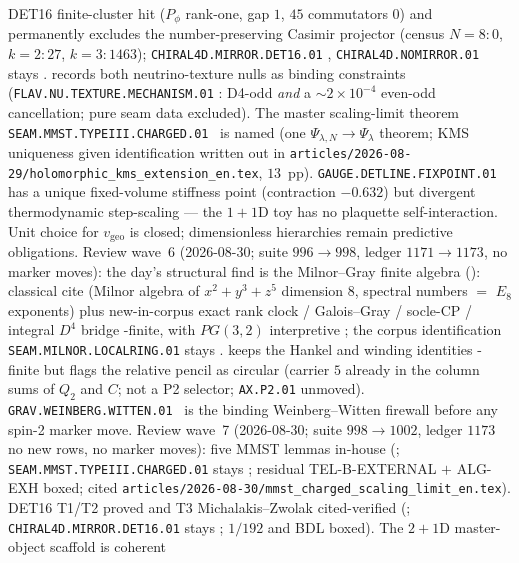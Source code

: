 \begin{keybox}
DET16 finite-cluster hit ($P_\phi$ rank-one, gap $1$, $45$ commutators $0$) and permanently
excludes the number-preserving Casimir projector (census $N{=}8{:}0$, $k{=}2{:}27$,
$k{=}3{:}1463$); \texttt{CHIRAL4D.MIRROR.DET16.01} \mC, \texttt{CHIRAL4D.NOMIRROR.01} stays \mO.
 records both
neutrino-texture nulls as binding constraints (\texttt{FLAV.NU.TEXTURE.MECHANISM.01} \mO:
D4-odd \emph{and} a $\sim2{\times}10^{-4}$ even-odd cancellation; pure seam data excluded).
The master scaling-limit theorem \texttt{SEAM.MMST.TYPEIII.CHARGED.01} \mO\ is named (one
$\Psi_{\lambda,N}\to\Psi_\lambda$ theorem; KMS uniqueness given identification written out in
\texttt{articles/2026-08-29/holomorphic\_kms\_extension\_en.tex}, $13$~pp).
\texttt{GAUGE.DETLINE.FIXPOINT.01} has a unique fixed-volume stiffness point (contraction
$-0.632$) but divergent thermodynamic step-scaling --- the $1{+}1$D toy has no plaquette
self-interaction.  Unit choice for $v_{\mathrm{geo}}$ is closed; dimensionless hierarchies
remain predictive obligations.
Review wave~6 (2026-08-30; suite $996\to998$, ledger $1171\to1173$, no marker moves):
the day's structural find is the Milnor--Gray finite algebra
():
classical cite (Milnor algebra of $x^2+y^3+z^5$ dimension $8$, spectral numbers $=$ $E_8$
exponents) plus new-in-corpus exact rank clock / Galois--Gray / socle-CP / integral $D^4$
bridge \mE-finite, with $PG(3,2)$ interpretive \mC; the corpus identification
\texttt{SEAM.MILNOR.LOCALRING.01} stays \mO.
 keeps the
Hankel and winding identities \mE-finite but flags the relative pencil as circular
(carrier $5$ already in the column sums of $Q_2$ and $C$; not a P2 selector;
\texttt{AX.P2.01} unmoved).
\texttt{GRAV.WEINBERG.WITTEN.01} \mO\ is the binding Weinberg--Witten firewall before any
spin-2 marker move.
Review wave~7 (2026-08-30; suite $998\to1002$, ledger $1173$ no new rows, no marker moves):
five MMST lemmas in-house
(;
\texttt{SEAM.MMST.TYPEIII.CHARGED.01} stays \mO; residual TEL-B-EXTERNAL $+$ ALG-EXH boxed;
cited \texttt{articles/2026-08-30/mmst\_charged\_scaling\_limit\_en.tex}).
DET16 T1/T2 proved and T3 Michalakis--Zwolak cited-verified
(;
\texttt{CHIRAL4D.MIRROR.DET16.01} stays \mC; $1/192$ and BDL boxed).
The $2{+}1$D master-object scaffold is coherent

\end{keybox}
